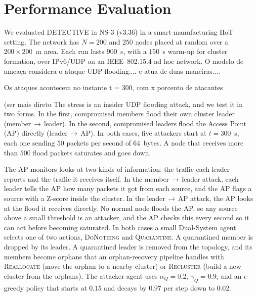 \documentclass[conference]{IEEEtran}
\newcommand{\ca}[1]{#1}
\begin{document}

\section{Performance Evaluation}

We evaluated DETECTIVE in NS-3 (v3.36) in a smart-manufacturing IIoT setting.
The network has $N = 200$ and $250$
nodes placed at random over a $200 \times 200$~m area. Each run lasts $900$~s,
with a $150$~s warm-up for cluster formation, over IPv6/UDP on an IEEE~802.15.4 ad
hoc network. \ca{O modelo de ameaça  considera o ataque UDP flooding.... e atua de duas maneiras.... }

\ca{Os ataques acontecem no instante t = 300, com x porcento de atacantes}

(ser mais direto The stress is an insider UDP flooding attack, and we test it in two forms. In the first, compromised members flood their own cluster leader (member\,$\to$\,leader). In the second, compromised leaders flood the Access Point (AP) directly (leader\,$\to$\,AP). In both cases, five attackers start at $t=300$~s, each one sending $50$ packets per second of $64$~bytes. A node that receives more than $500$ flood packets saturates and goes down.

The AP monitors looks at two kinds of information: the traffic each leader reports and the traffic it receives itself. In the member\,$\to$\,leader attack, each leader tells the AP how many packets it got from each source, and the AP flags a source with a Z-score inside the cluster. In the leader\,$\to$\,AP attack, the AP looks at the flood it receives directly. No normal node floods the AP, so any source above a small threshold is an attacker, and the AP checks this every second so it can act before becoming saturated. \ca{In both cases a small Dual-System agent selects one of two actions, \textsc{DoNothing} and \textsc{Quarantine}. A quarantined member is dropped
by its leader. A quarantined leader is removed from the topology, and its members
become orphans that an orphan-recovery pipeline handles with \textsc{Reallocate}
(move the orphan to a nearby cluster) or \textsc{Recluster} (build a new cluster
from the orphans). The attacker agent uses $\alpha_Q = 0.2$, $\gamma_Q = 0.9$, and
an $\epsilon$-greedy policy that starts at $0.15$ and decays by $0.97$ per step down
to $0.02$.}
\end{document}
